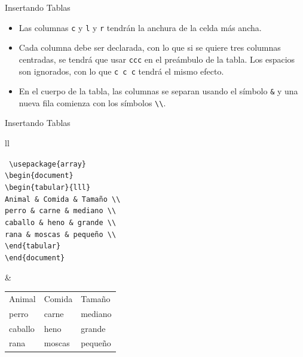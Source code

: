 \documentclass[12pt]{beamer}
\begin{document}
\begin{frame}{Insertando Tablas}
  \begin{itemize}
    \item<1-> Las columnas \texttt{\color{blue}c} y \texttt{\color{blue}l} y \texttt{\color{blue}r} tendrán la anchura de la celda más ancha.
    \item<2-> Cada columna debe ser declarada, con lo que si se quiere tres columnas centradas, se tendrá que usar \texttt{\color{blue}ccc} en el preámbulo de la tabla. Los espacios son ignorados, con lo que \texttt{\color{blue}c c c} tendrá el mismo efecto.
    \item <3-> En el cuerpo de la tabla, las columnas se separan usando el símbolo \texttt{\color{blue}\&} y una nueva fila comienza con los símbolos \texttt{\color{blue}\textbackslash\textbackslash}.
  \end{itemize}
\end{frame}
\begin{frame}{Insertando Tablas}
  \begin{tabular}{ll}
    \begin{minipage}{0.5\textwidth}
      \begin{block}{}
        \texttt{\color{blue}
          \textbackslash usepackage\{array\}\\
          \textbackslash begin\{document\}\\
          \textbackslash begin\{tabular\}\{lll\}\\          
          Animal  \& Comida \& Tamaño \textbackslash\textbackslash\\
          perro   \& carne  \& mediano \textbackslash\textbackslash\\
          caballo \& heno   \& grande  \textbackslash\textbackslash\\
          rana    \& moscas \& pequeño \textbackslash\textbackslash\\
          \textbackslash end\{tabular\}\\
          \textbackslash end\{document\}
        }
      \end{block}
    \end{minipage} &
    \begin{minipage}{0.5\textwidth}
      \begin{tabular}{lll}
        Animal  & Comida & Tamaño \\
        perro   & carne  & mediano \\
        caballo & heno   & grande \\
        rana    & moscas & pequeño \\
      \end{tabular}
    \end{minipage}
    \end{tabular}
\end{frame}
\end{document}
